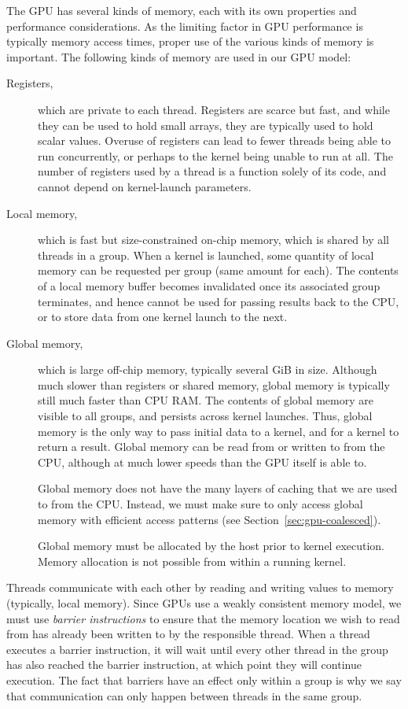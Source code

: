 The GPU has several kinds of memory, each with its own properties and
performance considerations.  As the limiting factor in GPU performance
is typically memory access times, proper use of the various kinds of
memory is important.  The following kinds of memory are used in our
GPU model:

\begin{description}
\item[Registers,] which are private to each thread.  Registers are
  scarce but fast, and while they can be used to hold small arrays,
  they are typically used to hold scalar values.  Overuse of registers
  can lead to fewer threads being able to run concurrently, or perhaps
  to the kernel being unable to run at all.  The number of registers
  used by a thread is a function solely of its code, and cannot depend
  on kernel-launch parameters.

\item[Local memory,] which is fast but size-constrained on-chip
  memory, which is shared by all threads in a group.  When a kernel is
  launched, some quantity of local memory can be requested per group
  (same amount for each).  The contents of a local memory buffer
  becomes invalidated once its associated group terminates, and hence
  cannot be used for passing results back to the CPU, or to store data
  from one kernel launch to the next.

\item[Global memory,] which is large off-chip memory, typically
  several GiB in size.  Although much slower than registers or shared
  memory, global memory is typically still much faster than CPU RAM.
  The contents of global memory are visible to all groups, and
  persists across kernel launches.  Thus, global memory is the only
  way to pass initial data to a kernel, and for a kernel to return a
  result.  Global memory can be read from or written to from the CPU,
  although at much lower speeds than the GPU itself is able to.

  Global memory does not have the many layers of caching that we are
  used to from the CPU.  Instead, we must make sure to only access
  global memory with efficient access patterns (see
  Section~\ref{sec:gpu-coalesced}).

  Global memory must be allocated by the host prior to kernel
  execution.  Memory allocation is not possible from within a running
  kernel.
\end{description}

Threads communicate with each other by reading and writing values to
memory (typically, local memory).  Since GPUs use a weakly consistent
memory model, we must use \textit{barrier instructions} to ensure that
the memory location we wish to read from has already been written to
by the responsible thread.  When a thread executes a barrier
instruction, it will wait until every other thread in the group has
also reached the barrier instruction, at which point they will
continue execution.  The fact that barriers have an effect only within
a group is why we say that communication can only happen between
threads in the same group.

